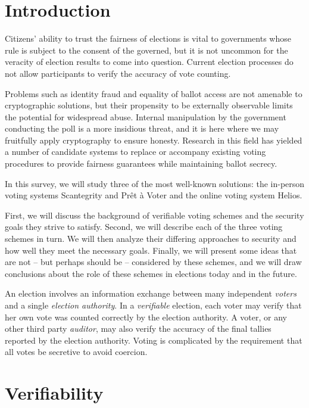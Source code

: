 \documentclass[10pt]{article}
\newcommand{\term}[1]{\textit{#1}}
\newcommand{\preta}{Pr\^{e}t \`{a}}
\newcommand{\pv}{\preta{} Voter}
\begin{document}
\begin{multicols}{2}

\section{Introduction}

Citizens' ability to trust the fairness of elections is vital to governments whose rule is subject
to the consent of the governed, but it is not uncommon for the veracity of election results to come
into question.  Current election processes do not allow participants to verify the accuracy of vote
counting.

Problems such as identity fraud and equality of ballot access are not amenable to cryptographic
solutions, but their propensity to be externally observable limits the potential for widespread
abuse.  Internal manipulation by the government conducting the poll is a more insidious threat, and
it is here where we may fruitfully apply cryptography to ensure honesty. Research in this field has
yielded a number of candidate systems to replace or accompany existing voting procedures to provide
fairness guarantees while maintaining ballot secrecy.

In this survey, we will study three of the most well-known solutions: the in-person voting systems
Scantegrity and \pv{} and the online voting system Helios.

First, we will discuss the background of verifiable voting schemes and the security goals they
strive to satisfy. Second, we will describe each of the three voting schemes in turn. We will then
analyze their differing approaches to security and how well they meet the necessary goals. Finally,
we will present some ideas that are not -- but perhaps should be -- considered by these schemes, and
we will draw conclusions about the role of these schemes in elections today and in the future.

An election involves an information exchange between many independent \term{voters} and a single
\term{election authority}.
In a \term{verifiable} election, each voter may verify that her own vote was counted correctly
by the election authority.
A voter, or any other third party \term{auditor}, may also verify the accuracy of the final tallies
reported by the election authority. \cite{preta}
Voting is complicated by the requirement that all votes be secretive to avoid coercion.

\section{Verifiability}


\end{multicols}
\end{document}
